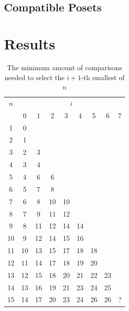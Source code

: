 \documentclass[10pt,journal,compsoc]{IEEEtran}
\begin{document}
\subsection{Compatible Posets}

\section{Results}

\begin{table}
  \centering
  \begin{tabular}{c|cccccccc}
    $n$ & \multicolumn{8}{c}{$i$}                                   \\
        & 0                       & 1  & 2  & 3  & 4  & 5  & 6  & 7 \\ \hline
    1   & 0                                                         \\
    2   & 1                                                         \\
    3   & 2                       & 3                               \\
    4   & 3                       & 4                               \\
    5   & 4                       & 6  & 6                          \\
    6   & 5                       & 7  & 8                          \\
    7   & 6                       & 8  & 10 & 10                    \\
    8   & 7                       & 9  & 11 & 12                    \\
    9   & 8                       & 11 & 12 & 14 & 14               \\
    10  & 9                       & 12 & 14 & 15 & 16               \\
    11  & 10                      & 13 & 15 & 17 & 18 & 18          \\
    12  & 11                      & 14 & 17 & 18 & 19 & 20          \\
    13  & 12                      & 15 & 18 & 20 & 21 & 22 & 23     \\
    14  & 13                      & 16 & 19 & 21 & 23 & 24 & 25     \\
    15  & 14                      & 17 & 20 & 23 & 24 & 26 & 26 & ? \\
  \end{tabular}
  \caption{The minimum amount of comparisons needed to select the $i+1$-th smallest of $n$}
  \label{table:num-comparisons}
\end{table}
\end{document}
